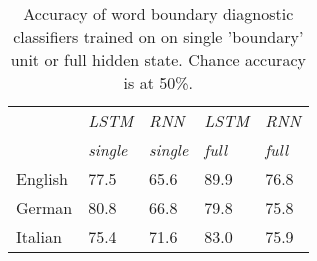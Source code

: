\begin{table}[t]
	\small
  \begin{center}
    \begin{tabular}{l|l|l|l|l|}
      \multicolumn{1}{c|}{}&\emph{LSTM}&\emph{RNN}&\emph{LSTM}&\emph{RNN}\\
            \multicolumn{1}{c|}{}&\emph{single}&\emph{single}&\emph{full}&\emph{full}\\
      \hline
      English & 77.5 & 65.6 & 89.9 & 76.8\\ 
      German  & 80.8 & 66.8 & 79.8 & 75.8\\ 
      Italian & 75.4 & 71.6 & 83.0 & 75.9\\ 
    \end{tabular}
  \end{center}
  \caption{\label{tab:segmentation-results} Accuracy of word boundary diagnostic classifiers trained on  on single 'boundary' unit or full hidden state. Chance accuracy is at 50\%.}
\end{table}



%

